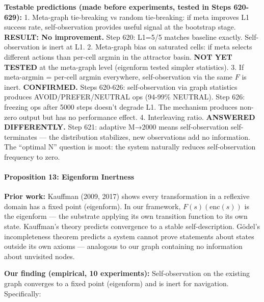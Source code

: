 \documentclass[
  11pt,
]{article}
\begin{document}
\textbf{Testable predictions (made before experiments, tested in Steps
620-629):} 1. Meta-graph tie-breaking vs random tie-breaking: if meta
improves L1 success rate, self-observation provides useful signal at the
bootstrap stage. \textbf{RESULT: No improvement.} Step 620: L1=5/5
matches baseline exactly. Self-observation is inert at L1. 2. Meta-graph
bias on saturated cells: if meta selects different actions than per-cell
argmin in the attractor basin. \textbf{NOT YET TESTED} at the meta-graph
level (eigenform tested simpler statistics). 3. If meta-argmin =
per-cell argmin everywhere, self-observation via the same \(F\) is
inert. \textbf{CONFIRMED.} Steps 620-626: self-observation via graph
statistics produces AVOID/PREFER/NEUTRAL ops (94-99\% NEUTRAL). Step
626: freezing ops after 5000 steps doesn't degrade L1. The mechanism
produces non-zero output but has no performance effect. 4. Interleaving
ratio. \textbf{ANSWERED DIFFERENTLY.} Step 621: adaptive M→2000 means
self-observation self-terminates --- the distribution stabilizes, new
observations add no information. The ``optimal N'' question is moot: the
system naturally reduces self-observation frequency to zero.

\paragraph{Proposition 13: Eigenform
Inertness}\label{proposition-13-eigenform-inertness}

\textbf{Prior work:} Kauffman (2009, 2017) shows every transformation in
a reflexive domain has a fixed point (eigenform). In our framework,
\(F(s)(\text{enc}(s))\) is the eigenform --- the substrate applying its
own transition function to its own state. Kauffman's theory predicts
convergence to a stable self-description. Gödel's incompleteness theorem
predicts a system cannot prove statements about states outside its own
axioms --- analogous to our graph containing no information about
unvisited nodes.

\textbf{Our finding (empirical, 10 experiments):} Self-observation on
the existing graph converges to a fixed point (eigenform) and is inert
for navigation. Specifically:
\end{document}
